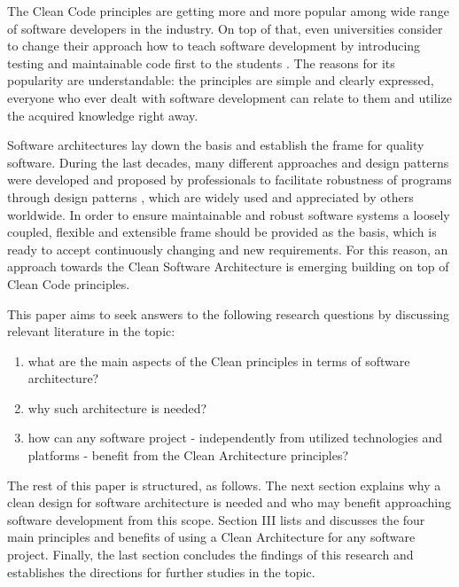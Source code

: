 \documentclass[conference]{IEEEtran}
\begin{document}
The Clean Code principles are getting more and more popular among wide range of software developers in the industry. On top of that, even universities consider to change their approach how to teach software development by introducing testing and maintainable code first to the students \cite{studentscleancode}. The reasons for its popularity are understandable: the principles are simple and clearly expressed, everyone who ever dealt with software development can relate to them and utilize the acquired knowledge right away. 

Software architectures lay down the basis and establish the frame for quality software. During the last decades, many different approaches and design patterns were developed and proposed by professionals to facilitate robustness of programs through design patterns \cite{codecomplete} \cite{onionarchitecture} \cite{gof}, which are widely used and appreciated by others worldwide. In order to ensure maintainable and robust software systems a loosely coupled, flexible and extensible frame should be provided as the basis, which is ready to accept continuously changing and new requirements. For this reason, an approach towards the Clean Software Architecture is emerging \cite{cleanarchitecture} building on top of Clean Code principles. 

This paper aims to seek answers to the following research questions by discussing relevant literature in the topic: 

\begin{enumerate}
	\item what are the main aspects of the Clean principles in terms of software architecture?
	\item why such architecture is needed?
	\item how can any software project - independently from utilized technologies and platforms - benefit from the Clean Architecture principles?
\end{enumerate}  

The rest of this paper is structured, as follows. The next section explains why a clean design for software architecture is needed and who may benefit approaching software development from this scope. Section III lists and discusses the four main principles and benefits of using a Clean Architecture for any software project. Finally, the last section concludes the findings of this research and establishes the directions for further studies in the topic. 
\end{document}
